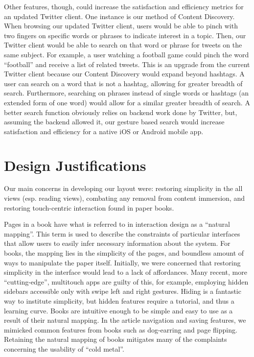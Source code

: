 \documentclass[11pt, oneside]{article}   	%
\begin{document}
Other features, though, could increase the satisfaction and efficiency metrics for an updated Twitter client. One instance is our method of Content Discovery. When browsing our updated Twitter client, users would be able to pinch with two fingers on specific words or phrases to indicate interest in a topic. Then, our Twitter client would be able to search on that word or phrase for tweets on the same subject. For example, a user watching a football game could pinch the word ``football'' and receive a list of related tweets. This is an upgrade from the current Twitter client because our Content Discovery would expand beyond hashtags. A user can search on a word that is not a hashtag, allowing for greater breadth of search. Furthermore, searching on phrases instead of single words or hashtags (an extended form of one word) would allow for a similar greater breadth of search. A better search function obviously relies on backend work done by Twitter, but, assuming the backend allowed it, our gesture based search would increase satisfaction and efficiency for a native iOS or Android mobile app.

\section{Design Justifications}
Our main concerns in developing our layout were: restoring simplicity in the all views (esp. reading views), combating any removal from content immersion, and restoring touch-centric interaction found in paper books.

Pages in a book have what is referred to in interaction design as a ``natural mapping''. This term is used to describe the constraints of particular interfaces that allow users to easily infer necessary information about the system. For books, the mapping lies in the simplicity of the pages, and boundless amount of ways to manipulate the paper itself. Initially, we were concerned that restoring simplicity in the interface would lead to a lack of affordances. Many recent, more ``cutting-edge'', multitouch apps are guilty of this, for example, employing hidden sidebars accessible only with swipe left and right gestures. Hiding is a fantastic way to institute simplicity, but hidden features require a tutorial, and thus a learning curve. Books are intuitive enough to be simple and easy to use as a result of their natural mapping. In the article navigation and saving features, we mimicked common features from books such as dog-earring and page flipping. Retaining the natural mapping of books mitigates many of the complaints concerning the usability of ``cold metal''.
\end{document}
